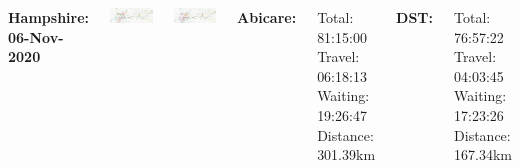 \documentclass[usenames,dvipsnames]{beamer}
\begin{document}

\begin{frame} %
	\begin{columns}
		\begin{minipage}[c][0.05\textheight][c]{\linewidth}
			\hspace{35mm}
			\textbf{Hampshire: 06-Nov-2020}
		\end{minipage}
		\begin{minipage}[c][0.45\textheight][c]{\linewidth}
			\centering
			\includegraphics[width=1\linewidth]{figures/06HampshireAbi}
		\end{minipage}
		\begin{minipage}[c][0.45\textheight][c]{\linewidth}
			\centering
			\includegraphics[width=1\linewidth]{figures/06HampshireDST}
		\end{minipage}
		\begin{minipage}[c][0.05\textheight][c]{\linewidth}
		\end{minipage}
		\begin{minipage}[c][0.45\textheight][c]{\linewidth}
			\scriptsize
			\textbf{Abicare:}
			\begin{itemize}
				\setlength{\itemindent}{-.2in}
				\aitem Total: 81:15:00
				\aitem Travel: 06:18:13
				\aitem Waiting: 19:26:47
				\aitem Distance: 301.39km
			\end{itemize}
		\end{minipage}
		\begin{minipage}[c][0.45\textheight][c]{\linewidth}
			\scriptsize
			\textbf{DST:}
			\begin{itemize}
				\setlength{\itemindent}{-.2in}
				\ditem Total: 76:57:22
				\ditem Travel: 04:03:45
				\ditem Waiting: 17:23:26
				\ditem Distance: 167.34km
			\end{itemize}
		\end{minipage}
	\end{columns}
\end{frame}
\end{document}
